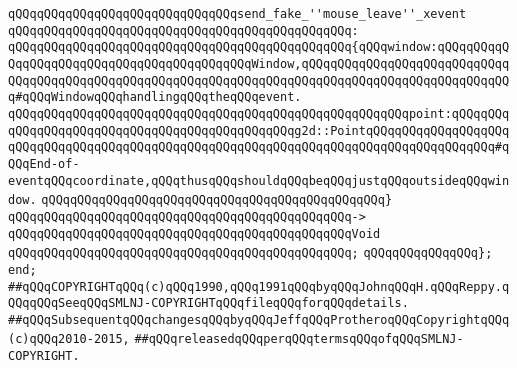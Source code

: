 \verb|qQQqqQQqqQQqqQQqqQQqqQQqqQQqqQQqsend_fake_''mouse_leave''_xevent|\newline
\verb|qQQqqQQqqQQqqQQqqQQqqQQqqQQqqQQqqQQqqQQqqQQqqQQq:|\newline
\verb|qQQqqQQqqQQqqQQqqQQqqQQqqQQqqQQqqQQqqQQqqQQqqQQq{qQQqwindow:qQQqqQQqqQQqqQQqqQQqqQQqqQQqqQQqqQQqqQQqqQQqWindow,qQQqqQQqqQQqqQQqqQQqqQQqqQQqqQQqqQQqqQQqqQQqqQQqqQQqqQQqqQQqqQQqqQQqqQQqqQQqqQQqqQQqqQQqqQQqqQQqqQQq#qQQqWindowqQQqhandlingqQQqtheqQQqevent.|\newline
\verb|qQQqqQQqqQQqqQQqqQQqqQQqqQQqqQQqqQQqqQQqqQQqqQQqqQQqqQQqpoint:qQQqqQQqqQQqqQQqqQQqqQQqqQQqqQQqqQQqqQQqqQQqqQQqg2d::PointqQQqqQQqqQQqqQQqqQQqqQQqqQQqqQQqqQQqqQQqqQQqqQQqqQQqqQQqqQQqqQQqqQQqqQQqqQQqqQQqqQQqqQQq#qQQqEnd-of-eventqQQqcoordinate,qQQqthusqQQqshouldqQQqbeqQQqjustqQQqoutsideqQQqwindow.|\newline
\verb|qQQqqQQqqQQqqQQqqQQqqQQqqQQqqQQqqQQqqQQqqQQqqQQq}|\newline
\verb|qQQqqQQqqQQqqQQqqQQqqQQqqQQqqQQqqQQqqQQqqQQqqQQq->|\newline
\verb|qQQqqQQqqQQqqQQqqQQqqQQqqQQqqQQqqQQqqQQqqQQqqQQqVoid|\newline
\verb|qQQqqQQqqQQqqQQqqQQqqQQqqQQqqQQqqQQqqQQqqQQqqQQq;|\newline
\verb|qQQqqQQqqQQqqQQq};|\newline
\newline
\verb|end;|\newline
\newline
\verb|##qQQqCOPYRIGHTqQQq(c)qQQq1990,qQQq1991qQQqbyqQQqJohnqQQqH.qQQqReppy.qQQqqQQqSeeqQQqSMLNJ-COPYRIGHTqQQqfileqQQqforqQQqdetails.|\newline
\verb|##qQQqSubsequentqQQqchangesqQQqbyqQQqJeffqQQqProtheroqQQqCopyrightqQQq(c)qQQq2010-2015,|\newline
\verb|##qQQqreleasedqQQqperqQQqtermsqQQqofqQQqSMLNJ-COPYRIGHT.|\newline


